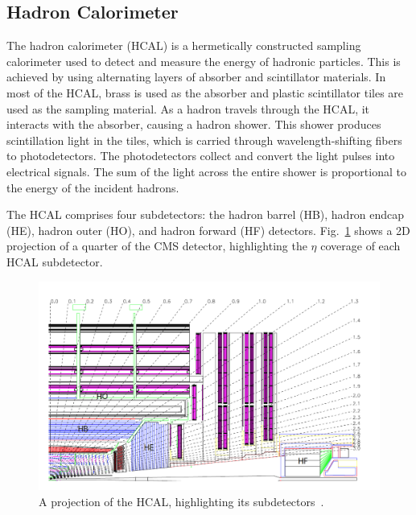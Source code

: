 \subsection{Hadron Calorimeter}

The hadron calorimeter (HCAL) is a hermetically constructed sampling calorimeter used to detect and measure the energy of hadronic particles. This is achieved by using alternating layers of absorber and scintillator materials. In most of the HCAL, brass is used as the absorber and plastic scintillator tiles are used as the sampling material. As a hadron travels through the HCAL, it interacts with the absorber, causing a hadron shower. This shower produces scintillation light in the tiles, which is carried through wavelength-shifting fibers to photodetectors. The photodetectors collect and convert the light pulses into electrical signals. The sum of the light across the entire shower is proportional to the energy of the incident hadrons.

The HCAL comprises four subdetectors: the hadron barrel (HB), hadron endcap (HE), hadron outer (HO), and hadron forward (HF) detectors. Fig.~\ref{hcal} shows a 2D projection of a quarter of the CMS detector, highlighting the $\eta$ coverage of each HCAL subdetector.

\begin{figure}[!htb]
	\centering
	\includegraphics[scale=0.65]{figures/hcal}
	\caption{A projection of the HCAL, highlighting its subdetectors~\cite{Chatrchyan:2008aa}.}
	\label{hcal}
\end{figure}

